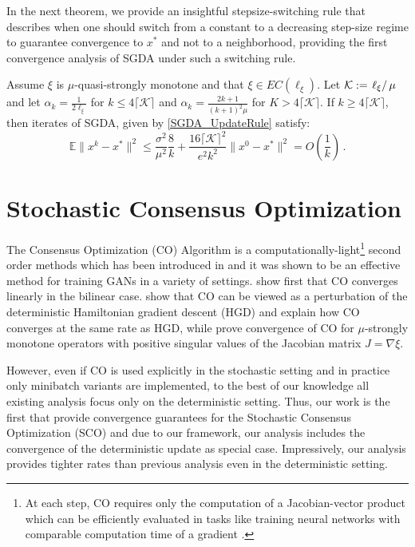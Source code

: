 \documentclass{article}
\begin{document}
In the next theorem, we provide an insightful stepsize-switching rule that
describes when one should switch from a constant
to a decreasing step-size regime to guarantee convergence to $x^*$ and not to a neighborhood, providing the first convergence analysis of SGDA under such a switching rule.
\begin{theorem}
\label{SGDA_DecreasingStep}
Assume $\xi$ is $\mu$-quasi-strongly monotone and that $\xi \in EC( \ell_{\xi})$. Let  $\mathcal{K} := \left.\ell_\xi\right/\mu$ and let $\alpha_k=\frac{1}{2 \ell_\xi} $ for $k \leq 4\lceil\mathcal{K} \rceil $ and $\alpha_k=\frac{2k+1}{(k+1)^2 \mu}$ for $K>4\lceil\mathcal{K} \rceil$. If $k \geq 4 \lceil\mathcal{K} \rceil$, then iterates of SGDA, given by \eqref{SGDA_UpdateRule} satisfy:
\vspace{-3mm}
\begin{equation}
\mathbb{E}\| x^{k} - x^*\|^2 \le   \frac{\sigma^2 }{\mu^2 }\frac{8 }{k} + \frac{16 \lceil\mathcal{K} \rceil^2}{e^2 k^2 }  \|x^0 - x^*\|^2 = O\left(\frac{1}{k}\right) \, .
\end{equation}
\end{theorem}
\section{Stochastic Consensus Optimization}
\label{sec:SCO}
The Consensus Optimization (CO) Algorithm is a computationally-light\footnote{At each step, CO requires only the computation of a Jacobian-vector product which can be efficiently evaluated in tasks like training neural networks with comparable computation time of a gradient \citep{pearlmutter1994fast}.} second order methods which has been introduced in \cite{mescheder2017numerics} and it was shown to be an effective method for training GANs in a variety of settings. \cite{liang2019interaction} show first that CO converges linearly in the bilinear case. \cite{abernethy2021last} show that CO can be viewed as a perturbation of the deterministic Hamiltonian gradient descent (HGD) and explain how CO converges at the same rate as HGD, while \cite{azizian2019tight} prove convergence of CO for $\mu$-strongly monotone operators with positive singular values of the Jacobian matrix $J=\nabla\xi$.

However, even if CO is used explicitly in the stochastic setting and in practice only minibatch variants are implemented, to the best of our knowledge all existing analysis focus only on the deterministic setting. Thus, our work is the first that provide convergence guarantees for the Stochastic Consensus Optimization (SCO) and due to our framework, our analysis includes the convergence of the deterministic update as special case. Impressively, our analysis provides tighter rates than previous analysis even in the deterministic setting. 
\end{document}
